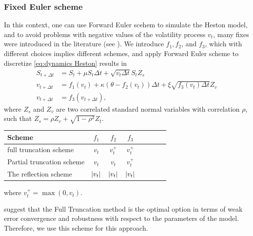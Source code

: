 \documentclass[11pt]{article}
\newcommand{\COMMA}{,}
\begin{document}
\subsubsection{Fixed Euler scheme}\label{sec:Discretization of Heston model with a non smooth transformations for the volatility process}
In this context, one can use Forward Euler scehem to simulate the Heston model, and to avoid  problems with negative values of the volatility process $v_t$, many fixes  were introduced in the literature (see \cite{lord2010comparison}). We introduce $f_1, f_2$, and $f_3$, which with different choices implies different schemes, and   apply Forward Euler scheme to discretize \ref{eq:dynamics Heston}  results in
\begin{align}\label{eq:FE_Heston_discrete}
S_{t+\Delta t}&= S_t +\mu S_t \Delta t+\sqrt{v_t \Delta t}S_t Z_s \nonumber\\
v_{t+\Delta t}&=f_1(v_t)+\kappa (\theta-f_2(v_t)) \Delta t+\xi \sqrt{f_3(v_t) \Delta t} Z_v \nonumber\\
v_{t+\Delta t}&=f_3(v_{t+\Delta t}) \COMMA
\end{align}
where $Z_s$ and $Z_v$  are two correlated standard normal variables with correlation $\rho$, such that $Z_s=\rho Z_v+\sqrt{1-\rho^2} Z_t$. 

\FloatBarrier
\begin{table}[h!]
	\centering
	\begin{tabular}{l*{6}{c}r}
		\toprule[1.5pt]
	Scheme &  $f_1$& $f_2$  & $f_3$     \\
	\hline
	full truncation scheme & $v_t$ &  $v_t^+$&$v_t^+$\\
	Partial truncation scheme & $v_t$ &  $v_t$&$v_t^+$\\
	The reflection scheme  &$\left\lvert v_t\right\rvert$ & $\left\lvert v_t\right\rvert$& $\left\lvert v_t\right\rvert$\\
			\bottomrule[1.25pt]
	\end{tabular}
	\label{Numerical schemes for CIR process}
\end{table}
\FloatBarrier
where  $v_t^+=\max(0,v_t)$.

\cite{lord2010comparison} suggest that the Full Truncation method is the optimal option in terms of weak error convergence and robustness with respect to the parameters of the model. Therefore,  we use this scheme for this approach. 
\end{document}
